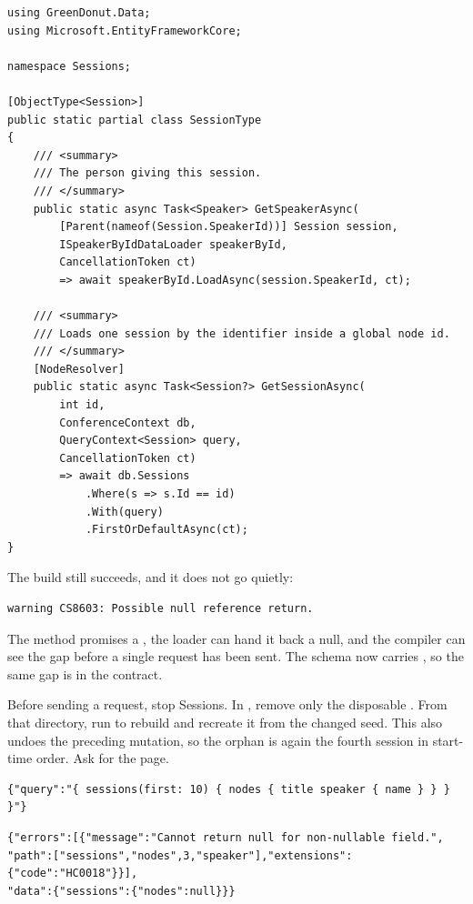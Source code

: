 \begin{verbatim}
using GreenDonut.Data;
using Microsoft.EntityFrameworkCore;

namespace Sessions;

[ObjectType<Session>]
public static partial class SessionType
{
    /// <summary>
    /// The person giving this session.
    /// </summary>
    public static async Task<Speaker> GetSpeakerAsync(
        [Parent(nameof(Session.SpeakerId))] Session session,
        ISpeakerByIdDataLoader speakerById,
        CancellationToken ct)
        => await speakerById.LoadAsync(session.SpeakerId, ct);

    /// <summary>
    /// Loads one session by the identifier inside a global node id.
    /// </summary>
    [NodeResolver]
    public static async Task<Session?> GetSessionAsync(
        int id,
        ConferenceContext db,
        QueryContext<Session> query,
        CancellationToken ct)
        => await db.Sessions
            .Where(s => s.Id == id)
            .With(query)
            .FirstOrDefaultAsync(ct);
}
\end{verbatim}

%
The build still succeeds, and it does not go quietly:

\begin{verbatim}
warning CS8603: Possible null reference return.
\end{verbatim}

The method promises a , the loader can hand it back a null, and
the compiler can see the gap before a single request has been sent. The schema
now carries , so the same gap is in the contract.

Before sending a request, stop Sessions. In , remove only
the disposable . From that directory, run
 to rebuild and recreate it from the changed seed.
This also undoes the preceding mutation, so the orphan is again the fourth
session in start-time order. Ask for the page.

\begin{verbatim}
{"query":"{ sessions(first: 10) { nodes { title speaker { name } } } }"}
\end{verbatim}

\begin{verbatim}
{"errors":[{"message":"Cannot return null for non-nullable field.",
"path":["sessions","nodes",3,"speaker"],"extensions":{"code":"HC0018"}}],
"data":{"sessions":{"nodes":null}}}
\end{verbatim}

